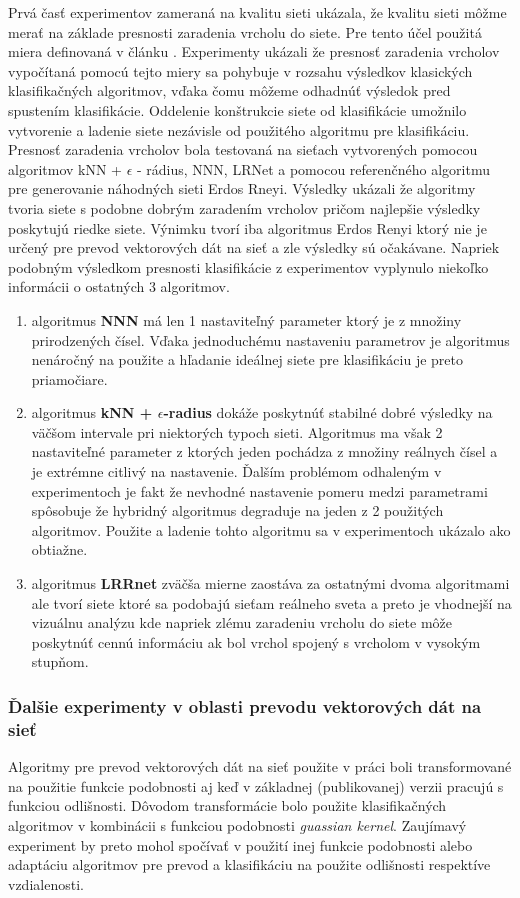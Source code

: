 \documentclass[slovak,master,dept460,male,cpp,cpdeclaration]{diploma}
\begin{document}
Prvá časť experimentov zameraná na kvalitu sieti ukázala, že kvalitu sieti môžme merať na základe presnosti zaradenia vrcholu do siete. Pre tento účel použitá miera definovaná v článku \cite{lrntet}. Experimenty ukázali že presnosť zaradenia vrcholov vypočítaná pomocú tejto miery sa pohybuje v rozsahu výsledkov klasických klasifikačných algoritmov, vďaka čomu môžeme odhadnúť výsledok pred spustením klasifikácie. Oddelenie konštrukcie siete od klasifikácie umožnilo vytvorenie a ladenie siete nezávisle od použitého algoritmu pre klasifikáciu. Presnosť zaradenia vrcholov bola testovaná na sieťach vytvorených pomocou algoritmov kNN + $\epsilon$ - rádius, NNN, LRNet a pomocou referenčného algoritmu pre generovanie náhodných sieti Erdos Rneyi. Výsledky ukázali že algoritmy tvoria siete s podobne dobrým zaradením vrcholov pričom najlepšie výsledky poskytujú riedke siete. Výnimku tvorí iba algoritmus Erdos Renyi ktorý nie je určený pre prevod vektorových dát na sieť a zle výsledky sú očakávane. Napriek podobným výsledkom presnosti klasifikácie z experimentov vyplynulo niekoľko informácii o ostatných 3 algoritmov.

\begin{enumerate}
\item algoritmus \textbf{NNN} má len 1 nastaviteľný parameter ktorý je z množiny prirodzených čísel. Vďaka jednoduchému nastaveniu parametrov je algoritmus nenáročný na použite a hľadanie ideálnej siete pre klasifikáciu je preto priamočiare.
\item algoritmus \textbf{kNN + $\epsilon$-radius} dokáže poskytnúť stabilné dobré výsledky na väčšom intervale pri niektorých typoch sieti. Algoritmus ma však 2 nastaviteľné parameter z ktorých jeden pochádza z množiny reálnych čísel a je extrémne citlivý na nastavenie. Ďalším problémom odhaleným v experimentoch je fakt že nevhodné nastavenie pomeru medzi parametrami spôsobuje že hybridný algoritmus degraduje na jeden z 2  použitých algoritmov. Použite a ladenie tohto algoritmu sa v experimentoch ukázalo ako obtiažne.
\item algoritmus \textbf{LRRnet} zväčša mierne zaostáva za ostatnými dvoma algoritmami ale tvorí siete ktoré sa podobajú sieťam reálneho sveta a preto je vhodnejší na vizuálnu analýzu kde napriek zlému zaradeniu vrcholu do siete môže poskytnúť cennú informáciu ak bol vrchol spojený s vrcholom v vysokým stupňom.
\end{enumerate}

\subsubsection{Ďalšie experimenty v oblasti prevodu vektorových dát na sieť}
Algoritmy pre prevod vektorových dát na sieť použite v práci boli transformované na použitie funkcie podobnosti aj keď  v základnej (publikovanej) verzii pracujú s funkciou odlišnosti. Dôvodom transformácie bolo použite klasifikačných algoritmov v kombinácii s funkciou podobnosti \textit{guassian kernel}. Zaujímavý experiment by preto mohol spočívať  v použití inej funkcie podobnosti alebo adaptáciu algoritmov pre prevod a klasifikáciu na použite odlišnosti respektíve vzdialenosti.
\end{document}
